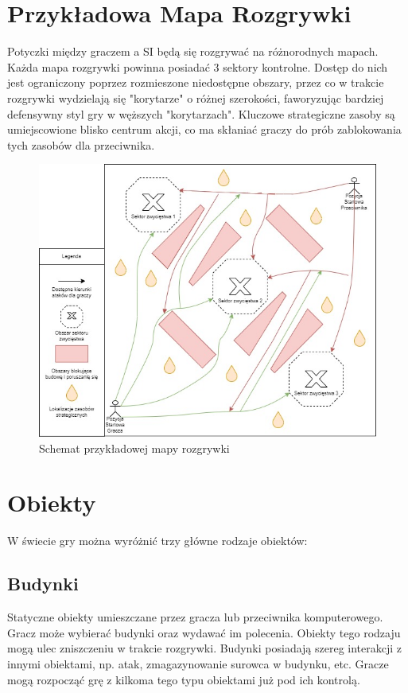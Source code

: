 \documentclass[a4paper]{scrreprt}
\begin{document}
\section{Przykładowa Mapa Rozgrywki}
Potyczki między graczem a SI będą się rozgrywać na różnorodnych mapach. Każda mapa rozgrywki powinna posiadać 3 sektory kontrolne. Dostęp do nich jest ograniczony poprzez rozmieszone niedostępne obszary, przez co w trakcie rozgrywki wydzielają się "korytarze" o różnej szerokości, faworyzując bardziej defensywny styl gry w węższych "korytarzach".
Kluczowe strategiczne zasoby są umiejscowione blisko centrum akcji, co ma skłaniać graczy do prób zablokowania tych zasobów dla przeciwnika.
\begin{figure}[hb]
  \centering
  \includegraphics[width=1\textwidth]{exampleMap.jpg}
  \caption{\label{fig:map1} Schemat przykładowej mapy rozgrywki}
  \end{figure}

\section{Obiekty}
W świecie gry można wyróżnić trzy główne rodzaje obiektów:
\subsection{Budynki}
Statyczne obiekty umieszczane przez gracza lub przeciwnika komputerowego. Gracz może wybierać budynki oraz wydawać im polecenia. Obiekty tego rodzaju mogą ulec zniszczeniu w trakcie rozgrywki. Budynki posiadają szereg interakcji z innymi obiektami, np. atak, zmagazynowanie surowca w budynku, etc. Gracze mogą rozpocząć grę z kilkoma tego typu obiektami już pod ich kontrolą.
\end{document}
